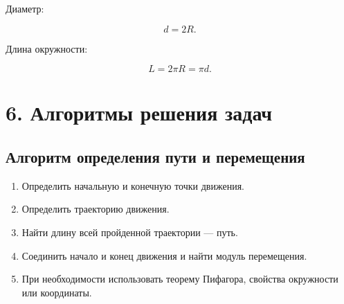 \documentclass[a4paper,12pt]{article}
\begin{document}
Диаметр:

\[
d=2R.
\]

Длина окружности:

\[
L=2\pi R=\pi d.
\]

\begin{center}
\end{center}


\section*{6. Алгоритмы решения задач}

\subsection*{Алгоритм определения пути и перемещения}

\begin{enumerate}
    \item Определить начальную и конечную точки движения.
    \item Определить траекторию движения.
    \item Найти длину всей пройденной траектории --- путь.
    \item Соединить начало и конец движения и найти модуль перемещения.
    \item При необходимости использовать теорему Пифагора,
    свойства окружности или координаты.
\end{enumerate}
\end{document}
